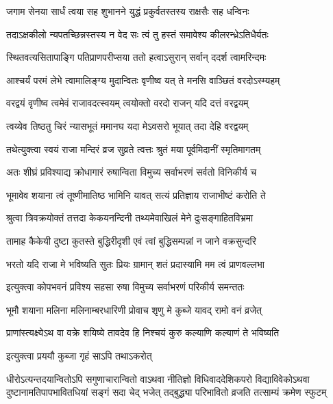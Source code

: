 \twolineshloka
{जगाम सेनया सार्धं त्वया सह शुभानने}
{युद्धं प्रकुर्वतस्तस्य राक्षसैः सह धन्विनः} %

\twolineshloka
{तदाऽक्षकीलो न्यपतच्छिन्नस्तस्य न वेद सः}
{त्वं तु हस्तं समावेश्य कीलरन्ध्रेऽतिधैर्यतः} %

\twolineshloka
{स्थितवत्यसितापाङ्गि पतिप्राणपरीप्सया}
{ततो हत्वाऽसुरान् सर्वान् ददर्श त्वामरिन्दमः} %

\twolineshloka
{आश्चर्यं परमं लेभे त्वामालिङ्ग्य मुदान्वितः}
{वृणीष्व यत् ते मनसि वाञ्छितं वरदोऽस्म्यहम्} %

\twolineshloka
{वरद्वयं वृणीष्व त्वमेवं राजावदत्स्वयम्}
{त्वयोक्तो वरदो राजन् यदि दत्तं वरद्वयम्} %

\twolineshloka
{त्वय्येव तिष्ठतु चिरं न्यासभूतं ममानघ}
{यदा मेऽवसरो भूयात् तदा देहि वरद्वयम्} %

\twolineshloka
{तथेत्युक्त्वा स्वयं राजा मन्दिरं व्रज सुव्रते}
{त्वत्तः श्रुतं मया पूर्वमिदानीं स्मृतिमागतम्} %

\twolineshloka
{अतः शीघ्रं प्रविश्याद्य क्रोधागारं रुषान्विता}
{विमुच्य सर्वाभरणं सर्वतो विनिकीर्य च} %

\twolineshloka
{भूमावेव शयाना त्वं तूष्णीमातिष्ठ भामिनि}
{यावत् सत्यं प्रतिज्ञाय राजाभीष्टं करोति ते} %

\twolineshloka
{श्रुत्वा त्रिवक्रयोक्तं तत्तदा केकयनन्दिनी}
{तथ्यमेवाखिलं मेने दुःसङ्गाहितविभ्रमा} %

\twolineshloka
{तामाह कैकेयी दुष्टा कुतस्ते बुद्धिरीदृशी}
{एवं त्वां बुद्धिसम्पन्नां न जाने वक्रसुन्दरि} %

\twolineshloka
{भरतो यदि राजा मे भविष्यति सुतः प्रियः}
{ग्रामान् शतं प्रदास्यामि मम त्वं प्राणवल्लभा} %

\twolineshloka
{इत्युक्त्वा कोपभवनं प्रविश्य सहसा रुषा}
{विमुच्य सर्वाभरणं परिकीर्य समन्ततः} %

\twolineshloka
{भूमौ शयाना मलिना मलिनाम्बरधारिणी}
{प्रोवाच शृणु मे कुब्जे यावद् रामो वनं व्रजेत्} %

\twolineshloka
{प्राणांस्त्यक्ष्येऽथ वा वक्रे शयिष्ये तावदेव हि}
{निश्चयं कुरु कल्याणि कल्याणं ते भविष्यति} %

\onelineshloka
{इत्युक्त्वा प्रययौ कुब्जा गृहं साऽपि तथाऽकरोत्} %


\fourlineindentedshloka
{धीरोऽत्यन्तदयान्वितोऽपि सगुणाचारान्वितो वाऽथवा}
{नीतिज्ञो विधिवाददेशिकपरो विद्याविवेकोऽथवा}
{दुष्टानामतिपापभावितधियां सङ्गं सदा चेद् भजेत्}
{तद्बुद्ध्या परिभावितो व्रजति तत्साम्यं क्रमेण स्फुटम्} %

